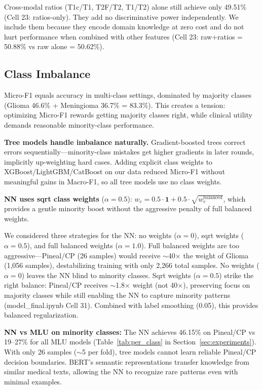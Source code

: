 Cross-modal ratios (T1c/T1, T2F/T2, T1/T2) alone still achieve only 49.51\% (Cell 23: ratios-only). They add no discriminative power independently. We include them because they encode domain knowledge at zero cost and do not hurt performance when combined with other features (Cell 23: raw+ratios = 50.88\% vs raw alone = 50.62\%).

\subsection{Class Imbalance}

Micro-F1 equals accuracy in multi-class settings, dominated by majority classes (Glioma 46.6\% + Meningioma 36.7\% = 83.3\%). This creates a tension: optimizing Micro-F1 rewards getting majority classes right, while clinical utility demands reasonable minority-class performance.

\textbf{Tree models handle imbalance naturally.} Gradient-boosted trees correct errors sequentially---minority-class mistakes get higher gradients in later rounds, implicitly up-weighting hard cases. Adding explicit class weights to XGBoost/LightGBM/CatBoost on our data reduced Micro-F1 without meaningful gains in Macro-F1, so all tree models use no class weights.

\textbf{NN uses sqrt class weights} ($\alpha=0.5$): $w_c = 0.5 \cdot \mathbf{1} + 0.5 \cdot \sqrt{w_c^{\text{balanced}}}$, which provides a gentle minority boost without the aggressive penalty of full balanced weights.

We considered three strategies for the NN: no weights ($\alpha=0$), sqrt weights ($\alpha=0.5$), and full balanced weights ($\alpha=1.0$). Full balanced weights are too aggressive---Pineal/CP (26 samples) would receive $\sim$40$\times$ the weight of Glioma (1,056 samples), destabilizing training with only 2,266 total samples. No weights ($\alpha=0$) leaves the NN blind to minority classes. Sqrt weights ($\alpha=0.5$) strike the right balance: Pineal/CP receives $\sim$1.8$\times$ weight (not 40$\times$), preserving focus on majority classes while still enabling the NN to capture minority patterns (model\_final.ipynb Cell 31). Combined with label smoothing (0.05), this provides balanced regularization.

\textbf{NN vs MLU on minority classes:} The NN achieves 46.15\% on Pineal/CP vs 19--27\% for all MLU models (Table~\ref{tab:per_class} in Section~\ref{sec:experiments}). With only 26 samples ($\sim$5 per fold), tree models cannot learn reliable Pineal/CP decision boundaries. BERT's semantic representations transfer knowledge from similar medical texts, allowing the NN to recognize rare patterns even with minimal examples.

